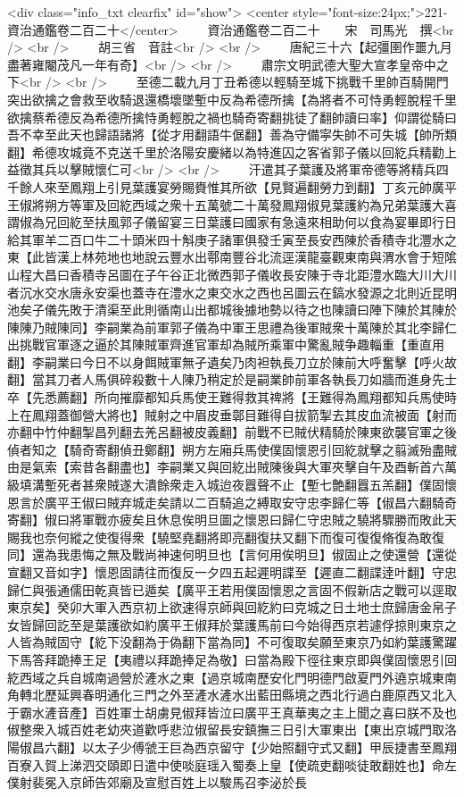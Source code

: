 <div class="info_txt clearfix" id="show">
<center style="font-size:24px;">221-資治通鑑卷二百二十</center>
  　　資治通鑑卷二百二十　　宋　司馬光　撰<br />
<br />
　　胡三省　音註<br />
<br />
　　唐紀三十六【起彊圉作噩九月盡著雍閹茂凡一年有奇】<br />
<br />
　　肅宗文明武德大聖大宣孝皇帝中之下<br />
<br />
　　至德二載九月丁丑希德以輕騎至城下挑戰千里帥百騎開門突出欲擒之會救至收騎退還橋壞墜塹中反為希德所擒【為將者不可恃勇輕脫程千里欲擒蔡希德反為希德所擒恃勇輕脫之禍也騎奇寄翻挑徒了翻帥讀曰率】仰謂從騎曰吾不幸至此天也歸語諸將【從才用翻語牛倨翻】善為守備寜失帥不可失城【帥所類翻】希德攻城竟不克送千里於洛陽安慶緒以為特進囚之客省郭子儀以回紇兵精勸上益徵其兵以擊賊懷仁可<br />
<br />
　　汗遣其子葉護及將軍帝德等將精兵四千餘人來至鳳翔上引見葉護宴勞賜賚惟其所欲【見賢遍翻勞力到翻】丁亥元帥廣平王俶將朔方等軍及回紇西域之衆十五萬號二十萬發鳳翔俶見葉護約為兄弟葉護大喜謂俶為兄回紇至扶風郭子儀留宴三日葉護曰國家有急遠來相助何以食為宴畢即行日給其軍羊二百口牛二十頭米四十斛庚子諸軍俱發壬寅至長安西陳於香積寺北灃水之東【此皆漢上林苑地也地說云豐水出鄠南豐谷北流逕漢龍臺觀東南與渭水會于短隂山程大昌曰香積寺呂圖在子午谷正北微西郭子儀收長安陳于寺北距澧水臨大川大川者沉水交水唐永安渠也蓋寺在澧水之東交水之西也呂圖云在鎬水發源之北則近昆明池矣子儀先敗于清渠至此則循南山出都城後據地勢以待之也陳讀曰陣下陳於其陳於陳陳乃賊陳同】李嗣業為前軍郭子儀為中軍王思禮為後軍賊衆十萬陳於其北李歸仁出挑戰官軍逐之逼於其陳賊軍齊進官軍却為賊所乘軍中驚亂賊争趣輜重【重直用翻】李嗣業曰今日不以身餌賊軍無孑遺矣乃肉袒執長刀立於陳前大呼奮擊【呼火故翻】當其刀者人馬俱碎殺數十人陳乃稍定於是嗣業帥前軍各執長刀如牆而進身先士卒【先悉薦翻】所向摧靡都知兵馬使王難得救其禆將【王難得為鳳翔都知兵馬使時上在鳳翔蓋御營大將也】賊射之中眉皮垂鄣目難得自拔箭掣去其皮血流被面【射而亦翻中竹仲翻掣昌列翻去羌呂翻被皮義翻】前戰不已賊伏精騎於陳東欲襲官軍之後偵者知之【騎奇寄翻偵丑鄭翻】朔方左廂兵馬使僕固懷恩引回紇就擊之翦滅殆盡賊由是氣索【索昔各翻盡也】李嗣業又與回紇出賊陳後與大軍夾擊自午及酉斬首六萬級填溝塹死者甚衆賊遂大潰餘衆走入城迨夜囂聲不止【塹七艶翻囂五羔翻】僕固懷恩言於廣平王俶曰賊弃城走矣請以二百騎追之縛取安守忠李歸仁等【俶昌六翻騎奇寄翻】俶曰將軍戰亦疲矣且休息俟明旦圖之懷恩曰歸仁守忠賊之驍將驟勝而敗此天賜我也奈何縱之使復得衆【驍堅堯翻將即亮翻復扶又翻下而復可復復脩復為敢復同】還為我患悔之無及戰尚神速何明旦也【言何用俟明旦】俶固止之使還營【還從宣翻又音如字】懷恩固請往而復反一夕四五起遲明諜至【遲直二翻諜逹叶翻】守忠歸仁與張通儒田乾真皆已遁矣【廣平王若用僕固懷恩之言固不假新店之戰可以逕取東京矣】癸卯大軍入西京初上欲速得京師與回紇約曰克城之日土地士庶歸唐金帛子女皆歸回訖至是葉護欲如約廣平王俶拜於葉護馬前曰今始得西京若遽俘掠則東京之人皆為賊固守【紇下没翻為于偽翻下當為同】不可復取矣願至東京乃如約葉護驚躍下馬答拜跪捧王足【夷禮以拜跪捧足為敬】曰當為殿下徑往東京即與僕固懷恩引回紇西域之兵自城南過營於滻水之東【過京城南歷安化門明德門啟夏門外遶京城東南角轉北歷延興春明通化三門之外至滻水滻水出藍田縣境之西北行過白鹿原西又北入于霸水滻音產】百姓軍士胡虜見俶拜皆泣曰廣平王真華夷之主上聞之喜曰朕不及也俶整衆入城百姓老幼夾道歡呼悲泣俶留長安鎮撫三日引大軍東出【東出京城門取洛陽俶昌六翻】以太子少傅虢王巨為西京留守【少始照翻守式又翻】甲辰捷書至鳳翔百寮入賀上涕泗交頤即日遣中使啖庭瑶入蜀奏上皇【使疏吏翻啖徒敢翻姓也】命左僕射裴冕入京師告郊廟及宣慰百姓上以駿馬召李泌於長